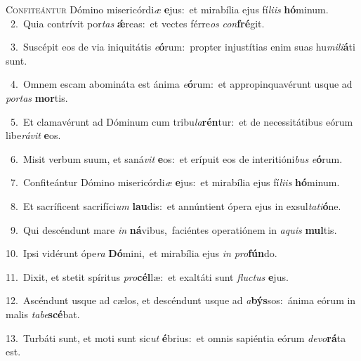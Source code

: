 \lettrine{\initial\textcolor{\initialcolor}{C}}{onfiteántur} Dómino misericórdi\textit{æ} \textbf{e}\-jus:~\star et mirabília ejus fí\-\textit{li}\-\textit{is} \textbf{hó}\-minum.\\
{\numbfont\textcolor{\numbcolor}{~2.}}~Quia contrívit por\textit{tas} \textbf{ǽ}\-reas:~\star et vectes férre\textit{os} \textit{con}\-\textbf{fré}git.\par
{\numbfont\textcolor{\numbcolor}{~3.}}~Suscépit eos de via iniquitátis \textit{e}\-\textbf{ó}rum:~\star propter injustítias enim suas hu\-\textit{mi}\-\textit{li}\textbf{á}ti sunt.\par
{\numbfont\textcolor{\numbcolor}{~4.}}~Omnem escam abomináta est ánima \textit{e}\-\textbf{ó}rum:~\star et appropinquavérunt usque ad \textit{por}\-\textit{tas} \textbf{mor}\-tis.\par
{\numbfont\textcolor{\numbcolor}{~5.}}~Et clamavérunt ad Dóminum cum tribu\-\textit{la}\-\textbf{rén}tur:~\star et de necessitátibus eórum libe\-\textit{rá}\-\textit{vit} \textbf{e}\-os.\par
{\numbfont\textcolor{\numbcolor}{~6.}}~Misit verbum suum, et saná\textit{vit} \textbf{e}\-os:~\star et erípuit eos de interitióni\textit{bus} \textit{e}\-\textbf{ó}rum.\par
{\numbfont\textcolor{\numbcolor}{~7.}}~Confiteántur Dómino misericórdi\textit{æ} \textbf{e}\-jus:~\star et mirabília ejus fí\-\textit{li}\-\textit{is} \textbf{hó}\-minum.\par
{\numbfont\textcolor{\numbcolor}{~8.}}~Et sacríficent sacrifíci\textit{um} \textbf{lau}\-dis:~\star et annúntient ópera ejus in exsul\-\textit{ta}\-\textit{ti}\textbf{ó}ne.\par
{\numbfont\textcolor{\numbcolor}{~9.}}~Qui descéndunt mare \textit{in} \textbf{ná}\-vibus,~\star faciéntes operatiónem in \textit{a}\-\textit{quis} \textbf{mul}\-tis.\par
{\numbfont\textcolor{\numbcolor}{10.}}~Ipsi vidérunt ópe\textit{ra} \textbf{Dó}\-mini,~\star et mirabília ejus \textit{in} \textit{pro}\-\textbf{fún}do.\par
{\numbfont\textcolor{\numbcolor}{11.}}~Dixit, et stetit spíritus \textit{pro}\-\textbf{cél}læ:~\star et exaltáti sunt \textit{fluc}\-\textit{tus} \textbf{e}\-jus.\par
{\numbfont\textcolor{\numbcolor}{12.}}~Ascéndunt usque ad cælos, et descéndunt usque ad \textit{a}\-\textbf{býs}sos:~\star ánima eórum in malis \textit{ta}\-\textit{be}\textbf{scé}bat.\par
{\numbfont\textcolor{\numbcolor}{13.}}~Turbáti sunt, et moti sunt sic\textit{ut} \textbf{é}\-brius:~\star et omnis sapiéntia eórum \textit{de}\-\textit{vo}\textbf{rá}ta est.\par
